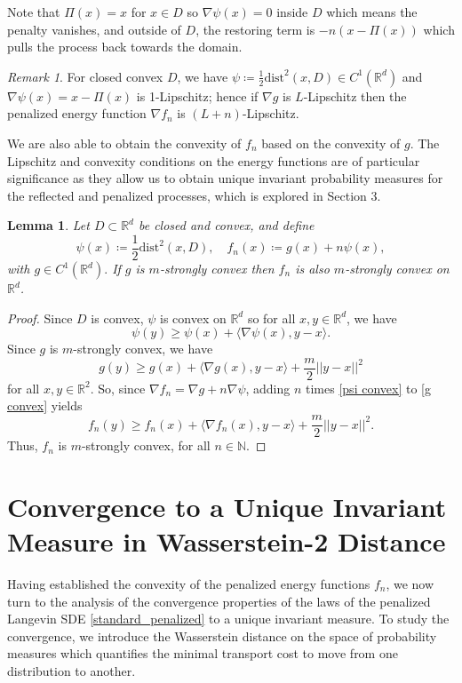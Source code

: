 \documentclass[amsfonts, reqno]{amsart}
\newtheorem{lem}[thm]{Lemma}
\theoremstyle{definition}
\theoremstyle{remark}
\newtheorem{rem}[thm]{Remark}
\newcommand{\bbR}{\mathbb{R}}
\newcommand{\bbN}{\mathbb{N}}
\newcommand{\dist}{\text{dist}}
\numberwithin{equation}{section}
\begin{document}
Note that $\Pi(x) = x$ for $x \in D$ so $\nabla\psi(x) = 0$ inside $D$ which means the penalty vanishes, and outside of $D$, the restoring term is $-n(x - \Pi(x))$ which pulls the process back towards the domain.
\begin{rem}
    For closed convex $D$, we have $\psi \coloneqq \frac{1}{2}\dist^2(x,D) \in C^1(\bbR^d)$ and $\nabla\psi(x) = x - \Pi(x)$ is 1-Lipschitz; hence if $\nabla g$ is $L$-Lipschitz then the penalized energy function $\nabla f_n$ is $(L + n)$-Lipschitz.
\end{rem}
We are also able to obtain the convexity of $f_n$ based on the convexity of $g.$ The Lipschitz and convexity conditions on the energy functions are of particular significance as they allow us to obtain unique invariant probability measures for the reflected and penalized processes, which is explored in Section 3.
\begin{lem}\label{f convex thm}
    Let $D \subset \bbR^d$ be closed and convex, and define \[
    \psi(x) \coloneqq \frac{1}{2}\dist^2(x,D), \quad f_n(x) \coloneqq g(x) + n\psi(x),
    \] with $g \in C^1(\bbR^d).$ If $g$ is $m$-strongly convex then $f_n$ is also $m$-strongly convex on $\bbR^d$.
\end{lem}
\begin{proof}
    Since $D$ is convex, $\psi$ is convex on $\bbR^d$ so for all $x,y \in \bbR^d$, we have \begin{equation}\label{psi convex}
        \psi(y) \geq \psi(x) + \langle \nabla\psi(x), y-x \rangle.
    \end{equation}
    Since $g$ is $m$-strongly convex, we have \begin{equation}\label{g convex}
        g(y) \geq g(x) + \langle \nabla g(x), y-x \rangle + \frac{m}{2}||y-x||^2
    \end{equation} for all $x,y \in \bbR^2$.
    So, since $\nabla f_n = \nabla g + n \nabla\psi$, adding $n$ times \eqref{psi convex} to \eqref{g convex} yields \[
    f_n(y) \geq f_n(x) + \langle \nabla f_n(x), y-x\rangle + \frac{m}{2}||y-x||^2.
    \] Thus, $f_n$ is $m$-strongly convex, for all $n \in \bbN$.
\end{proof}

\section{Convergence to a Unique Invariant Measure in Wasserstein-2 Distance}
Having established the convexity of the penalized energy functions $f_n$, we now turn to the analysis of the convergence properties of the laws of the penalized Langevin SDE \eqref{standard_penalized} to a unique invariant measure. To study the convergence, we introduce the Wasserstein distance on the space of probability measures which quantifies the minimal transport cost to move from one distribution to another. 
\end{document}
